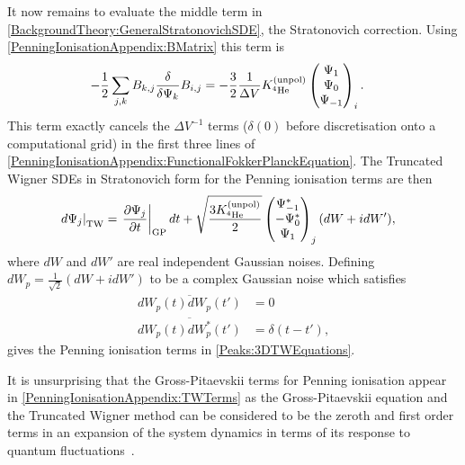 It now remains to evaluate the middle term in \eqref{BackgroundTheory:GeneralStratonovichSDE}, the Stratonovich correction. Using \eqref{PenningIonisationAppendix:BMatrix} this term is
\begin{align}
    - \frac{1}{2} \sum_{j, k} B_{k, j} \frac{\delta }{\delta \Psi_k}B_{i,j} &= - \frac{3}{2} \frac{1}{\Delta V} K^\text{(unpol)}_{^4\text{He}} 
    \begin{pmatrix}
        \Psi_1 \\
        \Psi_0 \\
        \Psi_{-1}
    \end{pmatrix}_i.
\end{align}
This term exactly cancels the $\Delta V^{-1}$ terms ($\delta(0)$ before discretisation onto a computational grid) in the first three lines of \eqref{PenningIonisationAppendix:FunctionalFokkerPlanckEquation}. The Truncated Wigner SDEs in Stratonovich form for the Penning ionisation terms are then
\begin{align}
    \left. d \Psi_j\right|_\text{TW} &= \left. \frac{\partial \Psi_j}{\partial t}\right|_\text{GP} dt + \sqrt{\frac{3 \Kunpol}{2}} 
    \begin{pmatrix}
        \Psi_{-1}^*\\
        -\Psi_{0}^*\\
        \Psi_{1}
    \end{pmatrix}_j (d W + i dW'),
    \label{PenningIonisationAppendix:TWTerms}
\end{align}
where $dW$ and $dW'$ are real independent Gaussian noises. Defining $ dW_p = \frac{1}{\sqrt{2}}\left(dW + i dW' \right)$ to be a complex Gaussian noise which satisfies
\begin{align}
    \overline{dW_p(t) dW_p(t')} &= 0 \\
    \overline{dW_p(t) dW_p^*(t')} &= \delta(t-t'),
\end{align}
gives the Penning ionisation terms in \eqref{Peaks:3DTWEquations}.

It is unsurprising that the Gross-Pitaevskii terms for Penning ionisation appear in \eqref{PenningIonisationAppendix:TWTerms} as the Gross-Pitaevskii equation and the Truncated Wigner method can be considered to be the zeroth and first order terms in an expansion of the system dynamics in terms of its response to quantum fluctuations~\citep{Polkovnikov:2003}.
